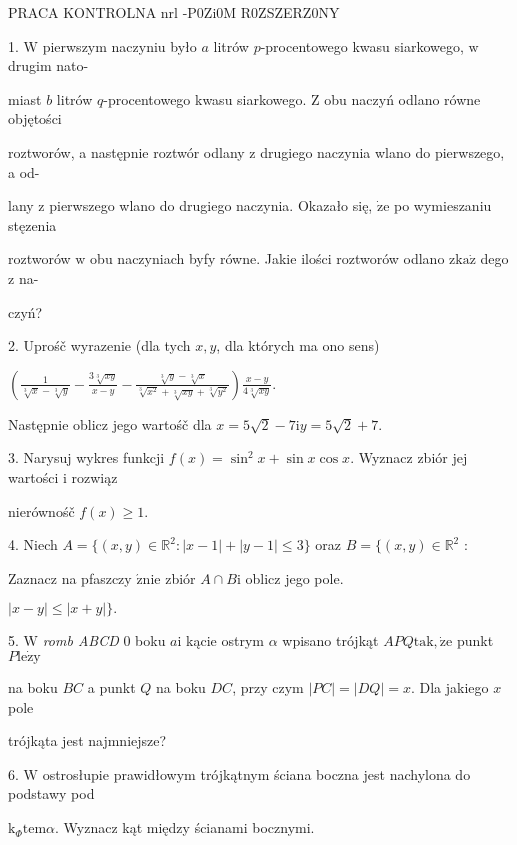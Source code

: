 \documentclass[a4paper,12pt]{article}
\begin{document}
PRACA KONTROLNA nrl -P0Zi0M R0ZSZERZ0NY

1. $\mathrm{W}$ pierwszym naczyniu było $a$ litrów $p$-procentowego kwasu siarkowego, $\mathrm{w}$ drugim nato-

miast $b$ litrów $q$-procentowego kwasu siarkowego. $\mathrm{Z}$ obu naczyń odlano równe objętości

roztworów, a następnie roztwór odlany $\mathrm{z}$ drugiego naczynia wlano do pierwszego, a od-

lany $\mathrm{z}$ pierwszego wlano do drugiego naczynia. Okazało się, $\dot{\mathrm{z}}\mathrm{e}$ po wymieszaniu stęzenia

roztworów $\mathrm{w}$ obu naczyniach byfy równe. Jakie ilości roztworów odlano $\mathrm{z}\mathrm{k}\mathrm{a}\dot{\mathrm{z}}$ dego $\mathrm{z}$ na-

czyń?

2. Uprośč wyrazenie (dla tych $x, y$, dla których ma ono sens)

$(\displaystyle \frac{1}{\sqrt[3]{x}-\sqrt[3]{y}}-\frac{3\sqrt[3]{xy}}{x-y}-\frac{\sqrt[3]{y}-\sqrt[3]{x}}{\sqrt[3]{x^{2}}+\sqrt[3]{xy}+\sqrt[3]{y^{2}}})\frac{x-y}{4\sqrt[3]{xy}}.$

Następnie oblicz jego wartośč dla $x=5\sqrt{2}-7\mathrm{i}y=5\sqrt{2}+7.$

3. Narysuj wykres funkcji $f(x)=\sin^{2}x+\sin x\cos x$. Wyznacz zbiór jej wartości $\mathrm{i}$ rozwiąz

nierównośč $f(x)\geq 1.$

4. Niech $A=\{(x,y)\in \mathbb{R}^{2}:|x-1|+|y-1|\leq 3\}$ oraz $B=\{(x,y)\in \mathbb{R}^{2}$ :

Zaznacz na pfaszczy $\acute{\mathrm{z}}\mathrm{n}\mathrm{i}\mathrm{e}$ zbiór $A\cap B\mathrm{i}$ oblicz jego pole.

$|x-y|\leq|x+y|\}.$

5. $\mathrm{W}$ {\it romb ABCD} $0$ boku $a\mathrm{i}$ kącie ostrym $\alpha$ wpisano trójkąt $APQ\mathrm{t}\mathrm{a}\mathrm{k}, \dot{\mathrm{z}}\mathrm{e}$ punkt $P\mathrm{l}\mathrm{e}\dot{\mathrm{z}}\mathrm{y}$

na boku $BC$ a punkt $Q$ na boku $DC$, przy czym $|PC|=|DQ|=x$. Dla jakiego $x$ pole

trójkąta jest najmniejsze?

6. $\mathrm{W}$ ostrosłupie prawidłowym trójkątnym ściana boczna jest nachylona do podstawy pod

$\mathrm{k}_{\Phi}\mathrm{t}\mathrm{e}\mathrm{m}\alpha$. Wyznacz kąt między ścianami bocznymi.
\end{document}
